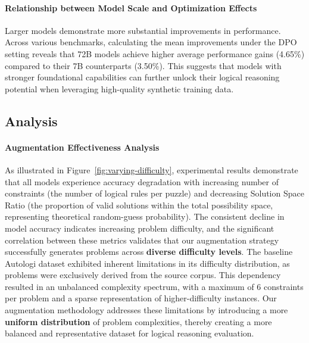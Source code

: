 \paragraph{Relationship between Model Scale and Optimization Effects}
Larger models demonstrate more substantial improvements in performance. Across various benchmarks, calculating the mean improvements under the DPO setting reveals that 72B models achieve higher average performance gains (4.65\%) compared to their 7B counterparts (3.50\%). This suggests that models with stronger foundational capabilities can further unlock their logical reasoning potential when leveraging high-quality synthetic training data.

\subsection{Analysis}
\label{sec:analysis}

\paragraph{Augmentation Effectiveness Analysis}

As illustrated in Figure~\ref{fig:varying-difficulty}, experimental results demonstrate that all models experience accuracy degradation with increasing number of constraints (the number of logical rules per puzzle) and decreasing Solution Space Ratio (the proportion of valid solutions within the total possibility space, representing theoretical random-guess probability). The consistent decline in model accuracy indicates increasing problem difficulty, and the significant correlation between these metrics validates that our augmentation strategy successfully generates problems across \textbf{diverse difficulty levels}.
The baseline Autologi dataset exhibited inherent limitations in its difficulty distribution, as problems were exclusively derived from the source corpus. This dependency resulted in an unbalanced complexity spectrum, with a maximum of 6 constraints per problem and a sparse representation of higher-difficulty instances. Our augmentation methodology addresses these limitations by introducing a more \textbf{uniform distribution} of problem complexities, thereby creating a more balanced and representative dataset for logical reasoning evaluation.


